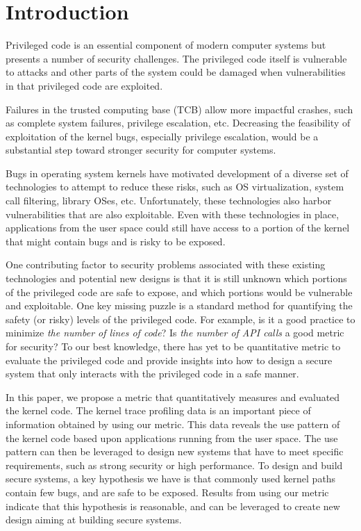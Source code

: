 \section{Introduction}
\label{sec.introduction}

Privileged code is an essential component of modern computer systems but 
presents a number of security challenges. The privileged code itself is vulnerable 
to attacks and other parts of the system could be damaged when vulnerabilities in 
that privileged code are exploited.

Failures in the trusted computing base (TCB) allow more impactful crashes, 
such as complete system failures, privilege escalation, etc. 
Decreasing the feasibility of exploitation of the kernel bugs, especially privilege escalation, 
would be a substantial step toward stronger security for computer systems.

Bugs in operating system kernels have motivated development of a diverse set of
technologies to attempt to reduce these risks, such as OS virtualization, system
call filtering, library OSes, etc. Unfortunately, these technologies also 
harbor vulnerabilities that are also exploitable. Even with these technologies in place,
applications from the user space could still have access to a portion of the kernel that might contain 
bugs and is risky to be exposed. 

One contributing factor to security problems associated with these existing technologies and potential
new designs is that it is still unknown which portions of the privileged code are
safe to expose, and which portions would be vulnerable and exploitable. 
One key missing puzzle is a standard method for quantifying the safety (or risky) levels of the privileged code. 
For example, is it a good practice to minimize \textit{the number of lines of code}?
Is \textit{the number of API calls} a good metric for security? 
To our best knowledge, there has yet to be quantitative metric to evaluate the privileged code and provide 
insights into how to design a secure system that only interacts with the privileged code in a safe manner.

In this paper, we propose a metric that quantitatively measures and evaluated the 
kernel code. The kernel trace profiling data is an important piece of information 
obtained by using our metric. This data reveals the use pattern of the kernel code 
based upon applications running from the user space. The use pattern can then be
leveraged to design new systems that have to meet specific requirements, 
such as strong security or high performance. To design and build secure systems, 
a key hypothesis we have is that commonly used kernel paths contain few bugs, and are 
safe to be exposed. Results from using our metric indicate that this hypothesis is reasonable, and 
can be leveraged to create new design aiming at building secure systems. 

